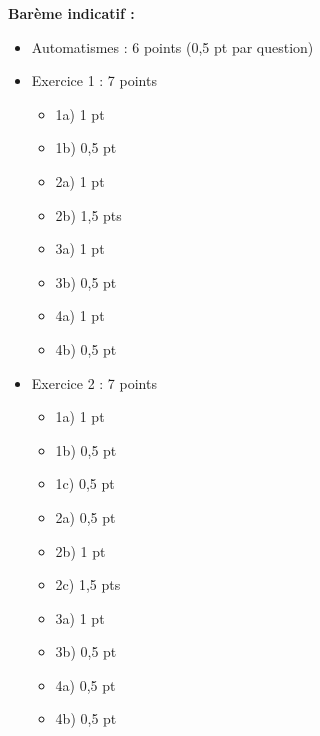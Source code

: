 \documentclass[a4paper,12pt]{article}
\begin{document}
\textbf{Barème indicatif :}
\begin{itemize}
\item Automatismes : 6 points (0,5 pt par question)
\item Exercice 1 : 7 points
  \begin{itemize}
  \item 1a) 1 pt
  \item 1b) 0,5 pt
  \item 2a) 1 pt
  \item 2b) 1,5 pts
  \item 3a) 1 pt
  \item 3b) 0,5 pt
  \item 4a) 1 pt
  \item 4b) 0,5 pt
  \end{itemize}
\item Exercice 2 : 7 points
  \begin{itemize}
  \item 1a) 1 pt
  \item 1b) 0,5 pt
  \item 1c) 0,5 pt
  \item 2a) 0,5 pt
  \item 2b) 1 pt
  \item 2c) 1,5 pts
  \item 3a) 1 pt
  \item 3b) 0,5 pt
  \item 4a) 0,5 pt
  \item 4b) 0,5 pt
  \end{itemize}
\end{itemize}
\end{document}
